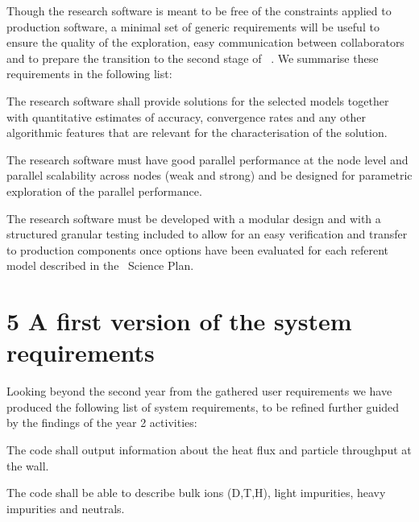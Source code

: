 \documentclass{article}
\begin{document}
Though the research software is meant to be free of the constraints applied to 
production software, a minimal set of generic requirements will be useful to ensure 
the quality of the exploration, easy communication between collaborators and to 
prepare the transition to the second stage of \nep \  . We summarise these requirements 
in the following list:

\begin{enumerate}
\end{enumerate}
\begin{itemize}
\end{itemize}
\item The research software shall provide solutions for the selected models together 
with quantitative estimates of accuracy, convergence rates and any other algorithmic 
features that are relevant for the characterisation of the solution.

\item The research software must have good parallel performance at the node level 
and parallel scalability across nodes (weak and strong) and be designed for parametric 
exploration of the parallel performance.

\item The research software must be developed with a modular design and with a structured 
granular testing included to allow for an easy verification and transfer to production 
components once options have been evaluated for each referent model described in 
the \nep \   Science Plan. 

\section*{{\Large{}{ \textbf{5 A first version of the system requirements}}}}

Looking beyond the second year from the gathered user requirements we have produced 
the following list of system requirements, to be refined further guided by the 
findings of the year 2 activities:

\begin{enumerate}
\end{enumerate}
\begin{itemize}
\end{itemize}
\item The code shall output information about the heat flux and particle throughput 
at the wall.

\item The code shall be able to describe bulk ions (D,T,H), light impurities,  heavy 
impurities and neutrals.
\end{document}
